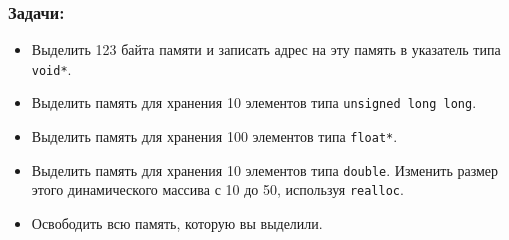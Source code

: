 \documentclass{article}
\begin{document}
\subsubsection*{Задачи:}
\begin{itemize}
\item Выделить 123 байта памяти и записать адрес на эту память в указатель типа \texttt{void*}.
\item Выделить память для хранения 10 элементов типа \texttt{unsigned long long}.
\item Выделить память для хранения 100 элементов типа \texttt{float*}.
\item Выделить память для хранения 10 элементов типа \texttt{double}. Изменить размер этого динамического массива с 10 до 50, используя \texttt{realloc}.
\item Освободить всю память, которую вы выделили.
\end{itemize}
\end{document}
